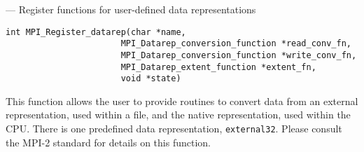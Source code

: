 \startmanpage
{}
--- Register functions for user-defined data  representations 
\startvb\begin{verbatim}
int MPI_Register_datarep(char *name,
                       MPI_Datarep_conversion_function *read_conv_fn,
                       MPI_Datarep_conversion_function *write_conv_fn,
                       MPI_Datarep_extent_function *extent_fn,
                       void *state)

\end{verbatim}
\endvb

\par
{}
This function allows the user to provide routines to convert data from
an external representation, used within a file, and the native representation,
used within the CPU.  There is one predefined data representation,
{\tt external32}.  Please consult the MPI-2 standard for details on this
function.
\par
\par
{}
\endmanpage
